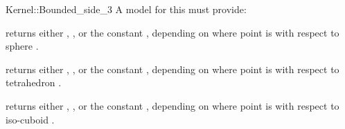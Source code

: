 \begin{ccRefFunctionObjectConcept}{Kernel::Bounded_side_3}
A model for this must provide:


{returns either ,
, or the constant
, depending on where point  is with
respect to sphere . }

{returns either ,
, or the constant
, depending on where point  is with
respect to tetrahedron . }

{returns either ,
, or the constant
, depending on where point  is with
respect to iso-cuboid . }

\ccIsModel{}

\end{ccRefFunctionObjectConcept}
